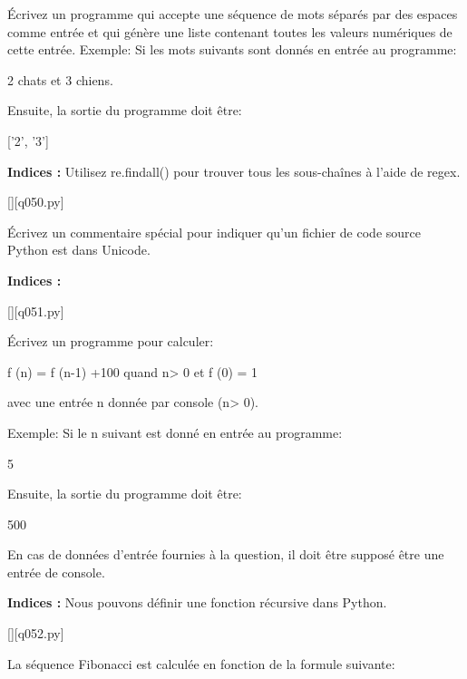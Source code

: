\question
Écrivez un programme qui accepte une séquence de mots séparés par des espaces comme entrée et qui génère une liste contenant toutes les valeurs numériques de cette entrée.\newline
Exemple:\newline
Si les mots suivants sont donnés en entrée au programme:\newline

2 chats et 3 chiens.\newline

Ensuite, la sortie du programme doit être:\newline

['2', '3']\newline

\par
\textbf{Indices : }Utilisez re.findall() pour trouver tous les sous-chaînes à l'aide de regex.
\renewcommand{\nomfichier}{q050.py}
\begin{solution}
    \pythonfile{\chemincode \nomfichier}[][\nomfichier]
\end{solution}


\question
Écrivez un commentaire spécial pour indiquer qu'un fichier de code source Python est dans Unicode.
\par
\textbf{Indices : }
\renewcommand{\nomfichier}{q051.py}
\begin{solution}
    \pythonfile{\chemincode \nomfichier}[][\nomfichier]
\end{solution}


\question
Écrivez un programme pour calculer:

f (n) = f (n-1) +100 quand n> 0
et f (0) = 1

avec une entrée n donnée par console (n> 0).

Exemple:
Si le n suivant est donné en entrée au programme:

5

Ensuite, la sortie du programme doit être:

500

En cas de données d'entrée fournies à la question, il doit être supposé être une entrée de console.
\par
\textbf{Indices : }Nous pouvons définir une fonction récursive dans Python.
\renewcommand{\nomfichier}{q052.py}
\begin{solution}
    \pythonfile{\chemincode \nomfichier}[][\nomfichier]
\end{solution}


\question
La séquence Fibonacci est calculée en fonction de la formule suivante:


